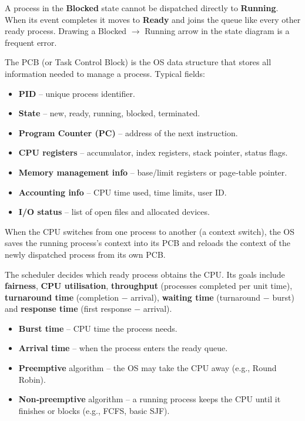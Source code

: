 \documentclass[11pt]{article}
\newcommand{\cle}[1]{{\popxbold\color{popdark}#1}}
\newcounter{popsec}
\newcounter{popsub}
\newcommand{\courssub}[1]{%
  \stepcounter{popsub}%
  \par\vspace{9pt}\noindent{\popxbold\fontsize{11.5}{13}\selectfont\color{popink}{\color{poporange}\thepopsec.\thepopsub}\hspace{6pt}#1}\par\nopagebreak\vspace{4pt}
}
\begin{document}
\begin{attention}
A process in the \textbf{Blocked} state cannot be dispatched directly to \textbf{Running}.  When its event completes it moves to \textbf{Ready} and joins the queue like every other ready process.  Drawing a Blocked $\to$ Running arrow in the state diagram is a frequent error.
\end{attention}

\begin{definition}
The \cle{PCB} (or Task Control Block) is the OS data structure that stores all information needed to manage a process.  Typical fields:
\begin{itemize}
  \item \textbf{PID} – unique process identifier.
  \item \textbf{State} – new, ready, running, blocked, terminated.
  \item \textbf{Program Counter (PC)} – address of the next instruction.
  \item \textbf{CPU registers} – accumulator, index registers, stack pointer, status flags.
  \item \textbf{Memory management info} – base/limit registers or page‑table pointer.
  \item \textbf{Accounting info} – CPU time used, time limits, user ID.
  \item \textbf{I/O status} – list of open files and allocated devices.
\end{itemize}
When the CPU switches from one process to another (a \cle{context switch}), the OS saves the running process's context into its PCB and reloads the context of the newly dispatched process from its own PCB.
\end{definition}

\courssub{CPU Scheduling}

The \cle{scheduler} decides which ready process obtains the CPU.  Its goals include \textbf{fairness}, \textbf{CPU utilisation}, \textbf{throughput} (processes completed per unit time), \textbf{turnaround time} (completion $-$ arrival), \textbf{waiting time} (turnaround $-$ burst) and \textbf{response time} (first response $-$ arrival).

\begin{aretenir}
\begin{itemize}
  \item \textbf{Burst time} – CPU time the process needs.
  \item \textbf{Arrival time} – when the process enters the ready queue.
  \item \textbf{Preemptive} algorithm – the OS may take the CPU away (e.g., Round Robin).
  \item \textbf{Non‑preemptive} algorithm – a running process keeps the CPU until it finishes or blocks (e.g., FCFS, basic SJF).
\end{itemize}
\end{aretenir}
\end{document}
